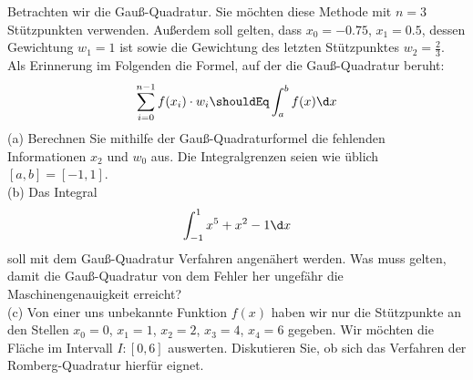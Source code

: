 \documentclass{scrartcl}
\begin{document}
	
	Betrachten wir die Gauß-Quadratur. Sie möchten diese Methode mit $n=3$ Stützpunkten verwenden. Außerdem soll gelten, dass $x_0 = -0.75$, $x_1 = 0.5$, dessen Gewichtung $w_1 = 1$ ist sowie die Gewichtung des letzten Stützpunktes $w_2 = \frac{2}{3}$.
	\n 
	Als Erinnerung im Folgenden die Formel, auf der die Gauß-Quadratur beruht:
	\begin{align*} 
		\sum_{i=0}^{n-1}f(x_i)\cdot w_i \shouldEq \int_{a}^{b}f(x) \d x 
	\end{align*}
	(a)
	Berechnen Sie mithilfe der Gauß-Quadraturformel die fehlenden Informationen $x_2$ und $w_0$ aus. Die Integralgrenzen seien wie üblich $[a,b] = [-1,1]$.
	\lbreak \lbreak \lbreak \lbreak
	\\
	(b)
	Das Integral 
	\begin{align*}
		\int_{-1}^{1} x^5 + x^2 -1 \d x
	\end{align*}
	soll mit dem Gauß-Quadratur Verfahren angenähert werden. Was muss gelten, damit die Gauß-Quadratur von dem Fehler her ungefähr die Maschinengenauigkeit erreicht?
	\lbreak \lbreak \lbreak
	\\
	(c) 
	Von einer uns unbekannte Funktion $f(x)$ haben wir nur die Stützpunkte an den Stellen $x_0 = 0$, $x_1 = 1$, $x_2 = 2$, $x_3 = 4$, $x_4 = 6$ gegeben. Wir möchten die Fläche im Intervall $I: [0, 6]$ auswerten. Diskutieren Sie, ob sich das Verfahren der Romberg-Quadratur hierfür eignet.
	


\end{document}
